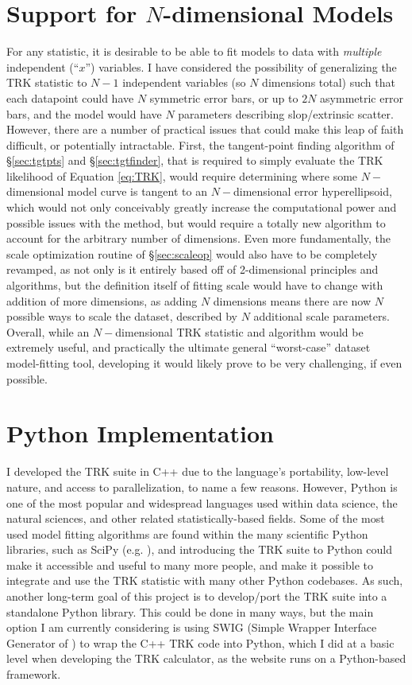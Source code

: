 \section{Support for $N$-dimensional Models}
For any statistic, it is desirable to be able to fit models to data with \textit{multiple} independent (``$x$'') variables. I have considered the possibility of generalizing the TRK statistic to $N-1$ independent variables (so $N$ dimensions total) such that each datapoint could have $N$ symmetric error bars, or up to $2N$ asymmetric error bars, and the model would have $N$ parameters describing slop/extrinsic scatter. However, there are a number of practical issues that could make this leap of faith difficult, or potentially intractable. First, the tangent-point finding algorithm of \S\ref{sec:tgtpts} and \S\ref{sec:tgtfinder}, that is required to simply evaluate the TRK likelihood of Equation \eqref{eq:TRK}, would require determining where some $N-$dimensional model curve is tangent to an $N-$dimensional error hyperellipsoid, which would not only conceivably greatly increase the computational power and possible issues with the method, but would require a totally new algorithm to account for the arbitrary number of dimensions. Even more fundamentally, the scale optimization routine of \S\ref{sec:scaleop} would also have to be completely revamped, as not only is it entirely based off of 2-dimensional principles and algorithms, but the definition itself of fitting scale would have to change with addition of more dimensions, as adding $N$ dimensions means there are now $N$ possible ways to scale the dataset, described by $N$ additional scale parameters. Overall, while an $N-$dimensional TRK statistic and algorithm would be extremely useful, and practically the ultimate general ``worst-case'' dataset model-fitting tool, developing it would likely prove to be very challenging, if even possible.

\section{Python Implementation}
I developed the TRK suite in C++ due to the language's portability, low-level nature, and access to parallelization, to name a few reasons. However, Python is one of the most popular and widespread languages used within data science, the natural sciences, and other related statistically-based fields. Some of the most used model fitting algorithms are found within the many scientific Python libraries, such as SciPy (e.g. \textcite{2020SciPy-NMeth}), and introducing the TRK suite to Python could make it accessible and useful to many more people, and make it possible to integrate and use the TRK statistic with many other Python codebases. As such, another long-term goal of this project is to develop/port the TRK suite into a standalone Python library. This could be done in many ways, but the main option I am currently considering is using SWIG (Simple Wrapper Interface Generator of \textcite{beazley1996swig}) to wrap the C++ TRK code into Python, which I did at a basic level when developing the TRK calculator, as the website runs on a Python-based framework.
